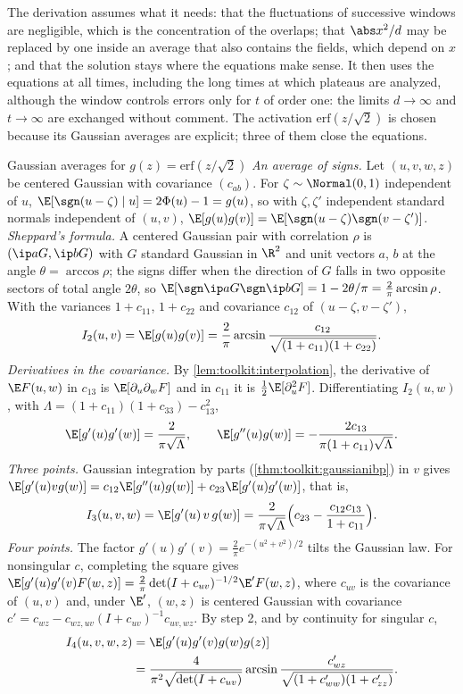 \begin{refsection}
The derivation assumes what it needs: that the fluctuations of successive windows are negligible, which is the concentration of the overlaps; that $\abs x^2/d$ may be replaced by one inside an average that also contains the fields, which depend on $x$; and that the solution stays where the equations make sense. It then uses the equations at all times, including the long times at which plateaus are analyzed, although the window controls errors only for $t$ of order one: the limits $d\to\infty$ and $t\to\infty$ are exchanged without comment. The activation $\mathrm{erf}(z/\sqrt2)$ is chosen because its Gaussian averages are explicit; three of them close the equations.

\begin{computation}{Gaussian averages for $g(z)=\mathrm{erf}(z/\sqrt2)$}\label{comp:sgd:averages}
\step \emph{An average of signs.} Let $(u,v,w,z)$ be centered Gaussian with covariance $(c_{ab})$. For $\zeta\sim\Normal(0,1)$ independent of $u$, $\E[\sgn(u-\zeta)\mid u]=2\Phi(u)-1=g(u)$, so with $\zeta,\zeta'$ independent standard normals independent of $(u,v)$, $\E[g(u)g(v)]=\E[\sgn(u-\zeta)\sgn(v-\zeta')]$.
\step \emph{Sheppard's formula.} A centered Gaussian pair with correlation $\rho$ is $(\ip aG,\ip bG)$ with $G$ standard Gaussian in $\R^2$ and unit vectors $a$, $b$ at the angle $\theta=\arccos\rho$; the signs differ when the direction of $G$ falls in two opposite sectors of total angle $2\theta$, so $\E[\sgn\ip aG\sgn\ip bG]=1-2\theta/\pi=\frac2\pi\arcsin\rho$. With the variances $1+c_{11}$, $1+c_{22}$ and covariance $c_{12}$ of $(u-\zeta,v-\zeta')$,
\[
I_2(u,v)=\E[g(u)g(v)]=\frac2\pi\arcsin\frac{c_{12}}{\sqrt{(1+c_{11})(1+c_{22})}}.
\]
\step \emph{Derivatives in the covariance.} By \cref{lem:toolkit:interpolation}, the derivative of $\E F(u,w)$ in $c_{13}$ is $\E[\partial_u\partial_wF]$ and in $c_{11}$ it is $\frac12\E[\partial_u^2F]$. Differentiating $I_2(u,w)$, with $\Lambda=(1+c_{11})(1+c_{33})-c_{13}^2$,
\[
\E[g'(u)g'(w)]=\frac2{\pi\sqrt\Lambda},\qquad\E[g''(u)g(w)]=-\frac{2c_{13}}{\pi(1+c_{11})\sqrt\Lambda}.
\]
\step \emph{Three points.} Gaussian integration by parts (\cref{thm:toolkit:gaussianibp}) in $v$ gives $\E[g'(u)vg(w)]=c_{12}\E[g''(u)g(w)]+c_{23}\E[g'(u)g'(w)]$, that is,
\[
I_3(u,v,w)=\E[g'(u)\,v\,g(w)]=\frac2{\pi\sqrt\Lambda}\Bigl(c_{23}-\frac{c_{12}c_{13}}{1+c_{11}}\Bigr).
\]
\step \emph{Four points.} The factor $g'(u)g'(v)=\frac2\pi e^{-(u^2+v^2)/2}$ tilts the Gaussian law. For nonsingular $c$, completing the square gives $\E[g'(u)g'(v)F(w,z)]=\frac2\pi\det(I+c_{uv})^{-1/2}\E'F(w,z)$, where $c_{uv}$ is the covariance of $(u,v)$ and, under $\E'$, $(w,z)$ is centered Gaussian with covariance $c'=c_{wz}-c_{wz,uv}(I+c_{uv})^{-1}c_{uv,wz}$. By step 2, and by continuity for singular $c$,
\[
\begin{aligned}
I_4(u,v,w,z)&=\E[g'(u)g'(v)g(w)g(z)]\\
&=\frac4{\pi^2\sqrt{\det(I+c_{uv})}}\arcsin\frac{c'_{wz}}{\sqrt{(1+c'_{ww})(1+c'_{zz})}}.
\end{aligned}
\]
\end{computation}


\end{refsection}
